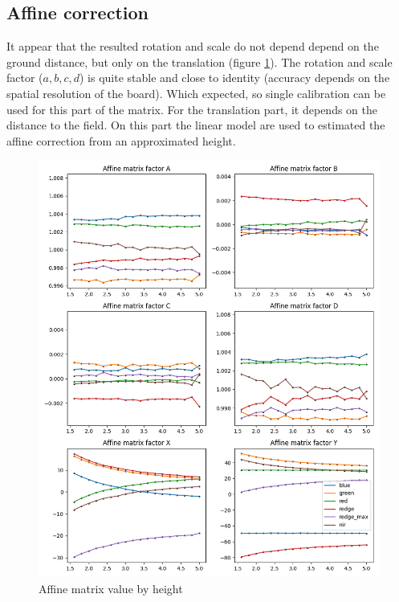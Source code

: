 \documentclass[]{elsarticle}
\begin{document}
	\newpage
	\subsection{Affine correction}
	
	It appear that the resulted rotation and scale do not depend depend on the ground distance, but only on the translation (figure \ref{fig:affine-translation-height}).
	The rotation and scale factor ($a,b,c,d$) is quite stable and close to identity (accuracy depends on the spatial resolution of the board).
	Which expected, so single calibration can be used for this part of the matrix.
	For the translation part, it depends on the distance to the field.
	On this part the linear model are used to estimated the affine correction from an approximated height.
	
	\begin{figure}[!htb]
		\centering
		\includegraphics[width=\linewidth]{../figures/affine-translation-height.png}
		\caption{Affine matrix value by height}
		\label{fig:affine-translation-height}
	\end{figure}
\end{document}

